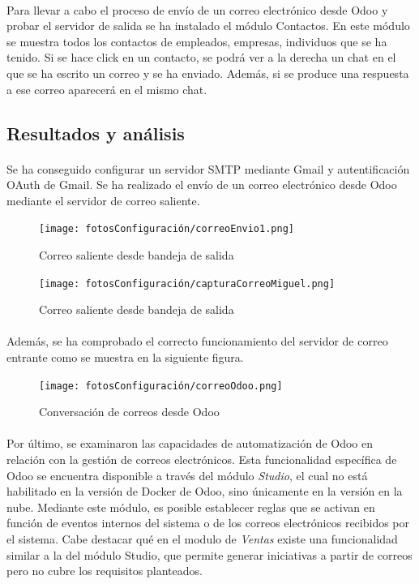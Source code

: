 \paragraph{}
Para llevar a cabo el proceso de envío de un correo electrónico desde Odoo y probar el servidor de salida se ha instalado el módulo Contactos. En este módulo se muestra todos los contactos de empleados, empresas, individuos que se ha tenido. Si se hace click en un contacto, se podrá ver a la derecha un chat en el que se ha escrito un correo y se ha enviado. Además, si se produce una respuesta a ese correo aparecerá en el mismo chat. 
\subsection{Resultados y análisis}
\paragraph{}
Se ha conseguido configurar un servidor SMTP mediante Gmail y autentificación OAuth de Gmail. Se ha realizado el envío de un correo electrónico desde Odoo mediante el servidor de correo saliente.
\begin{figure}[h]
    \centering
    \texttt{[image: fotosConfiguración/correoEnvio1.png]}
    \caption{Correo saliente desde bandeja de salida}
    \label{fig:enter-label}
\end{figure}
\newpage
\begin{figure}[h]
    \centering
    \texttt{[image: fotosConfiguración/capturaCorreoMiguel.png]}
    \caption{Correo saliente desde bandeja de salida}
    \label{fig:enter-label}
\end{figure}
\paragraph{}
Además, se ha comprobado el correcto funcionamiento del servidor de correo entrante como se muestra en la siguiente figura.
\begin{figure}[h]
    \centering
    \texttt{[image: fotosConfiguración/correoOdoo.png]}
    \caption{Conversación de correos desde Odoo}
    \label{fig:enter-label}
\end{figure}
\paragraph{}
Por último, se examinaron las capacidades de automatización de Odoo en relación con la gestión de correos electrónicos. Esta funcionalidad específica de Odoo se encuentra disponible a través del módulo \textit{Studio}, el cual no está habilitado en la versión de Docker de Odoo, sino únicamente en la versión en la nube. Mediante este módulo, es posible establecer reglas que se activan en función de eventos internos del sistema o de los correos electrónicos recibidos por el sistema.
Cabe destacar qué en el modulo de \textit{Ventas} existe una funcionalidad similar a la del módulo Studio, que permite generar iniciativas a partir de correos pero no cubre los requisitos planteados.
